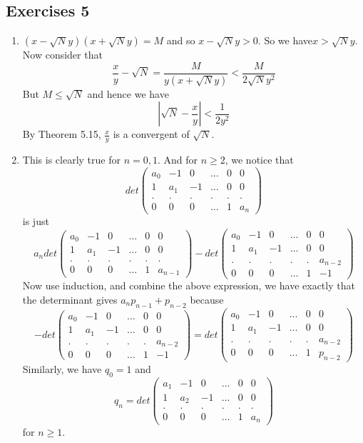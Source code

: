 \subsection{Exercises 5}
\begin{enumerate}
\item $(x-\sqrt{N}y)(x+\sqrt{N}y)=M$ and so $x -\sqrt{N}y>0$. So we have$x>\sqrt{N}y$.
   Now consider that
   $$\frac{x}{y}-\sqrt{N}=\frac{M}{y(x+\sqrt{N}y)} < \frac{M}{2\sqrt{N}y^2}$$
   But $M \le \sqrt{N}$ and hence we have
   $$\left|\sqrt{N}-\frac{x}{y}\right| < \frac{1}{2y^2}$$
   By Theorem 5.15, $\frac{x}{y}$ is a convergent of $\sqrt{N}$.
\item This is clearly true for $n=0,1$. And for $n \ge 2$, we notice that
      $$det\begin{pmatrix} a_0 &-1& 0& \ldots&0&0\\ 1&a_1& -1 &\ldots & 0 &0\\.&.&.&.&.&.\\
      0&0&0&\ldots&1&a_n \end{pmatrix}$$
      is just
       $$a_n det\begin{pmatrix} a_0 &-1& 0& \ldots&0&0\\ 1&a_1& -1 &\ldots & 0 &0\\.&.&.&.&.&.\\ 0&0&0&\ldots&1&a_{n-1} \end{pmatrix} - det \begin{pmatrix} a_0 &-1& 0& \ldots&0&0\\ 1&a_1& -1 &\ldots & 0 &0\\.&.&.&.&.&a_{n-2}\\ 0&0&0&\ldots&1&-1 \end{pmatrix}$$
      Now use induction, and combine the above expression, we have exactly that
      the determinant gives $a_n p_{n-1}+p_{n-2}$ because
      $$-det \begin{pmatrix} a_0 &-1& 0& \ldots&0&0\\ 1&a_1& -1 &\ldots & 0 &0\\.&.&.&.&.&a_{n-2}\\ 0&0&0&\ldots&1&-1 \end{pmatrix}=det \begin{pmatrix} a_0 &-1& 0& \ldots&0&0\\ 1&a_1& -1 &\ldots & 0 &0\\.&.&.&.&.&a_{n-2}\\ 0&0&0&\ldots&1&p_{n-2} \end{pmatrix}$$
     Similarly, we have $q_0=1$ and
     $$q_n=det\begin{pmatrix} a_1 &-1& 0& \ldots&0&0\\ 1&a_2& -1 &\ldots & 0 &0\\.&.&.&.&.&.\\
      0&0&0&\ldots&1&a_n \end{pmatrix}$$
      for $n \ge 1$.


\end{enumerate}
